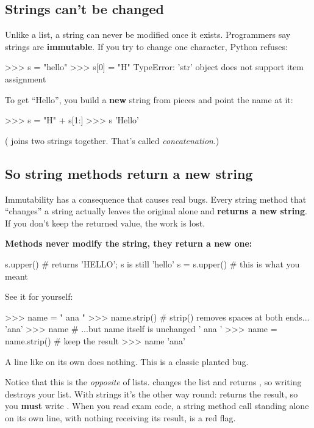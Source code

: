 \documentclass[10pt,a4paper]{article}
\begin{document}
\subsection{Strings can’t be changed}
Unlike a list, a string can never be modified once it exists. Programmers say strings are \textbf{immutable}. If you try to change one character, Python refuses:
\begin{txtcode}
>>> s = "hello"
>>> s[0] = "H"
TypeError: 'str' object does not support item assignment
\end{txtcode}
To get “Hello”, you build a \textbf{new} string from pieces and point the name  at it:
\begin{txtcode}
>>> s = "H" + s[1:]
>>> s
'Hello'
\end{txtcode}
(\code{+} joins two strings together. That’s called \emph{concatenation}.)
\subsection{So string methods return a new string}
Immutability has a consequence that causes real bugs. Every string method that “changes” a string actually leaves the original alone and \textbf{returns a new string}. If you don’t keep the returned value, the work is lost.
\begin{keybox}
\textbf{Methods never modify the string, they return a new one:}
\end{keybox}
\begin{pycode}
s.upper()       # returns 'HELLO'; s is still 'hello'
s = s.upper()   # this is what you meant
\end{pycode}
See it for yourself:
\begin{txtcode}
>>> name = "  ana  "
>>> name.strip()        # strip() removes spaces at both ends...
'ana'
>>> name                # ...but name itself is unchanged
'  ana  '
>>> name = name.strip() # keep the result
>>> name
'ana'
\end{txtcode}
\begin{trapbox}
A line like  on its own does nothing. This is a classic planted bug.
\end{trapbox}
Notice that this is the \emph{opposite} of lists.  changes the list and returns , so writing  destroys your list. With strings it’s the other way round:  returns the result, so you \textbf{must} write . When you read exam code, a string method call standing alone on its own line, with nothing receiving its result, is a red flag.
\setcounter{section}{1}
\end{document}
